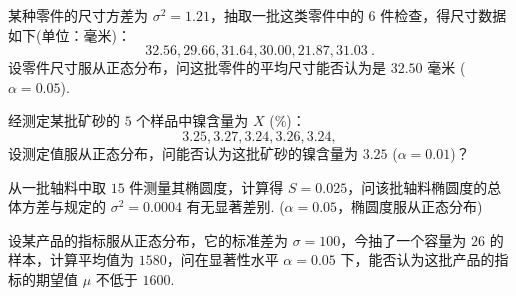 	\begin{titwo}
		某种零件的尺寸方差为 $\sigma^{2} = 1.21$，抽取一批这类零件中的 $6$ 件检查，得尺寸数据如下(单位：毫米)：
		\[
			32.56,29.66,31.64,30.00,21.87,31.03~.
		\]
		设零件尺寸服从正态分布，问这批零件的平均尺寸能否认为是 $32.50$ 毫米 ($\alpha = 0.05$).
	\end{titwo}

	\begin{titwo}
		经测定某批矿砂的 $5$ 个样品中镍含量为 $X$ (\si{\percent})：
		\[
			3.25,3.27,3.24,3.26,3.24,
		\]
		设测定值服从正态分布，问能否认为这批矿砂的镍含量为 $3.25$ ($\alpha = 0.01$)？
	\end{titwo}

	\begin{titwo}
		从一批轴料中取 $15$ 件测量其椭圆度，计算得 $S = 0.025$，问该批轴料椭圆度的总体方差与规定的 $\sigma^{2} = 0.0004$ 有无显著差别. ($\alpha = 0.05$，椭圆度服从正态分布)
	\end{titwo}

	\begin{titwo}
		设某产品的指标服从正态分布，它的标准差为 $\sigma = 100$，今抽了一个容量为 $26$ 的样本，计算平均值为 $1580$，问在显著性水平 $\alpha = 0.05$ 下，能否认为这批产品的指标的期望值 $\mu$ 不低于 $1600$.
    \end{titwo}
    \guanggao